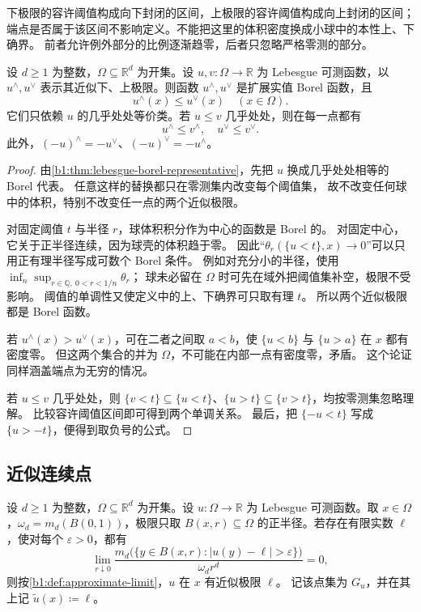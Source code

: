 下极限的容许阈值构成向下封闭的区间，上极限的容许阈值构成向上封闭的区间；
端点是否属于该区间不影响定义。不能把这里的体积密度换成小球中的本性上、下确界。
前者允许例外部分的比例逐渐趋零，后者只忽略严格零测的部分。

\begin{proposition}\label{b1:prop:approximate-limits-basic}
设 \(d\ge1\) 为整数，\(\Omega\subseteq\mathbb R^d\) 为开集。设 \(u,v:\Omega\to\mathbb R\) 为 Lebesgue 可测函数，以 \(u^\wedge,u^\vee\) 表示其近似下、上极限。则函数 \(u^\wedge,u^\vee\) 是扩展实值 Borel 函数，且
\[
 u^\wedge(x)\le u^\vee(x)\quad(x\in\Omega).
\]
它们只依赖 \(u\) 的几乎处处等价类。若 \(u\le v\) 几乎处处，则在每一点都有
\[
 u^\wedge\le v^\wedge,\quad u^\vee\le v^\vee.
\]
此外，\((-u)^\wedge=-u^\vee\)、\((-u)^\vee=-u^\wedge\)。
\end{proposition}
\begin{proof}
由\cref{b1:thm:lebesgue-borel-representative}，先把 \(u\) 换成几乎处处相等的 Borel 代表。
任意这样的替换都只在零测集内改变每个阈值集，
故不改变任何球中的体积，特别不改变任一点的两个近似极限。

对固定阈值 \(t\) 与半径 \(r\)，球体积积分作为中心的函数是 Borel 的。
对固定中心，它关于正半径连续，因为球壳的体积趋于零。
因此“\(\theta_r(\{u<t\},x)\to0\)”可以只用正有理半径写成可数个 Borel 条件。
例如对充分小的半径，使用
\(\inf_{n}\sup_{r\in\mathbb Q,\ 0<r<1/n}\theta_r\)；
球未必留在 \(\Omega\) 时可先在域外把阈值集补空，极限不受影响。
阈值的单调性又使定义中的上、下确界可只取有理 \(t\)。
所以两个近似极限都是 Borel 函数。

若 \(u^\wedge(x)>u^\vee(x)\)，可在二者之间取 \(a<b\)，使
\(\{u<b\}\) 与 \(\{u>a\}\) 在 \(x\) 都有密度零。
但这两个集合的并为 \(\Omega\)，不可能在内部一点有密度零，矛盾。
这个论证同样涵盖端点为无穷的情况。

若 \(u\le v\) 几乎处处，则
\(\{v<t\}\subseteq\{u<t\}\)、\(\{u>t\}\subseteq\{v>t\}\)，均按零测集忽略理解。
比较容许阈值区间即可得到两个单调关系。
最后，把 \(\{-u<t\}\) 写成 \(\{u>-t\}\)，便得到取负号的公式。
\end{proof}

\subsection{近似连续点}
\label{b1:subsec:280102}

\begin{definition}\label{b1:def:bv-finite-approximate-limit}
设 \(d\ge1\) 为整数，\(\Omega\subseteq\mathbb R^d\) 为开集。设 \(u:\Omega\to\mathbb R\) 为 Lebesgue 可测函数。取 \(x\in\Omega\)，\(\omega_d=m_d(B(0,1))\)，极限只取 \(B(x,r)\subseteq\Omega\) 的正半径。若存在有限实数 \(\ell\)，使对每个 \(\varepsilon>0\)，都有
\begin{equation}\label{b1:eq:approximate-limit-density}
 \lim_{r\downarrow0}
 \frac{m_d\bigl(\{y\in B(x,r):|u(y)-\ell|>\varepsilon\}\bigr)}
 {\omega_dr^d}=0,
\end{equation}
则按\cref{b1:def:approximate-limit}，\(u\) 在 \(x\) 有近似极限 \(\ell\)。
记该点集为 \(G_u\)，并在其上记 \(\widetilde u(x)\coloneqq\ell\)。
\end{definition}

